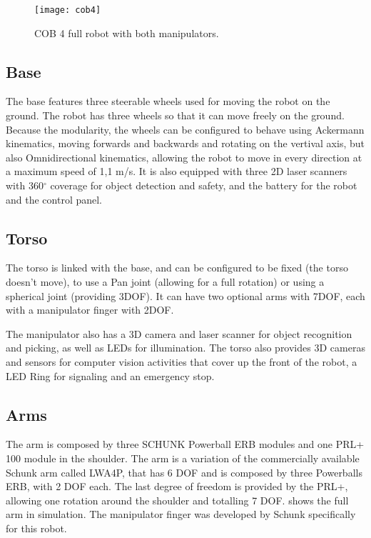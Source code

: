 \begin{figure}[!ht]
\centering
\texttt{[image: cob4]}
\caption{COB 4 full robot with both manipulators.}
\label{fig:cob4}
\end{figure}

\subsection{Base}

The base features three steerable wheels used for moving the robot on the ground. The robot has three wheels so that it can move freely on the ground. Because the modularity, the wheels can be configured to behave using Ackermann kinematics, moving forwards and backwards and rotating on the vertival axis, but also Omnidirectional kinematics, allowing the robot to move in every direction at a maximum speed of 1,1 m/s. It is also equipped with three 2D laser scanners with 360$^{\circ}$ coverage for object detection and safety, and the battery for the robot and the control panel.

\subsection{Torso}

The torso is linked with the base, and can be configured to be fixed (the torso doesn't move), to use a Pan joint (allowing for a full rotation) or using a spherical joint (providing 3DOF). It can have two optional arms with 7DOF, each with a manipulator finger with 2DOF.

The manipulator also has a 3D camera and laser scanner for object recognition and picking, as well as LEDs for illumination. The torso also provides 3D cameras and sensors for computer vision activities that cover up the front of the robot, a LED Ring for signaling and an emergency stop.

\subsection{Arms}

The arm is composed by three SCHUNK Powerball ERB modules and one PRL+ 100 module  in  the  shoulder. The arm is a variation of the commercially available Schunk arm called LWA4P, that has 6 DOF and is composed by three Powerballs ERB, with 2 DOF each. The last degree of freedom is provided by the PRL+, allowing one rotation around the shoulder and totalling 7 DOF.  shows the full arm in simulation. The manipulator finger was developed by Schunk specifically for this robot.

